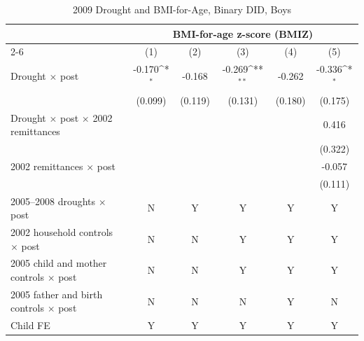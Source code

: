 \documentclass[12pt]{article}
\def\sym#1{\ifmmode^{#1}\else\(^{#1}\)\fi}
\begin{document}
\begin{longtable}{l*{5}{c}}
\caption{2009 Drought and BMI-for-Age, Binary DID, Boys}\\
\toprule
 & \multicolumn{5}{c}{BMI-for-age z-score (BMIZ)}\\
\cmidrule(lr){2-6}
            &\multicolumn{1}{c}{(1)}         &\multicolumn{1}{c}{(2)}         &\multicolumn{1}{c}{(3)}         &\multicolumn{1}{c}{(4)}         &\multicolumn{1}{c}{(5)}         \\
\midrule
Drought \ensuremath{\times} post&      -0.170\sym{*}  &      -0.168         &      -0.269\sym{**} &      -0.262         &      -0.336\sym{*}  \\
            &     (0.099)         &     (0.119)         &     (0.131)         &     (0.180)         &     (0.175)         \\
Drought \ensuremath{\times} post \ensuremath{\times} 2002 remittances&                     &                     &                     &                     &       0.416         \\
            &                     &                     &                     &                     &     (0.322)         \\
2002 remittances \ensuremath{\times} post&                     &                     &                     &                     &      -0.057         \\
            &                     &                     &                     &                     &     (0.111)         \\
\midrule
2005--2008 droughts \ensuremath{\times} post&           N         &           Y         &           Y         &           Y         &           Y         \\
2002 household controls \ensuremath{\times} post&           N         &           N         &           Y         &           Y         &           Y         \\
2005 child and mother controls \ensuremath{\times} post&           N         &           N         &           Y         &           Y         &           Y         \\
2005 father and birth controls \ensuremath{\times} post&           N         &           N         &           N         &           Y         &           N         \\
Child FE    &           Y         &           Y         &           Y         &           Y         &           Y         \\

\end{longtable}
\end{document}
